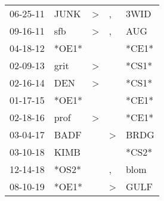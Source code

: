 \begin{supertabular}{p{0.07\textwidth}p{0.06\textwidth}p{0.02\textwidth}p{0.02\textwidth}p{0.06\textwidth}}
 06-25-11\textsuperscript{} &  JUNK\textsuperscript{} &  \textgreater &             , &  3WID\textsuperscript{} \\
 09-16-11\textsuperscript{} &   sfb\textsuperscript{} &  \textgreater &             , &   AUG\textsuperscript{} \\
 04-18-12\textsuperscript{} &                   *OE1* &               &               &                   *CE1* \\
 02-09-13\textsuperscript{} &  grit\textsuperscript{} &  \textgreater &               &                   *CS1* \\
 02-16-14\textsuperscript{} &   DEN\textsuperscript{} &  \textgreater &               &                   *CS1* \\
 01-17-15\textsuperscript{} &                   *OE1* &               &               &                   *CE1* \\
 02-18-16\textsuperscript{} &  prof\textsuperscript{} &  \textgreater &               &                   *CE1* \\
 03-04-17\textsuperscript{} &  BADF\textsuperscript{} &               &  \textgreater &  BRDG\textsuperscript{} \\
 03-10-18\textsuperscript{} &  KIMB\textsuperscript{} &               &               &                   *CS2* \\
 12-14-18\textsuperscript{} &                   *OS2* &               &             , &  blom\textsuperscript{} \\
 08-10-19\textsuperscript{} &                   *OE1* &               &  \textgreater &  GULF\textsuperscript{} \\
\end{supertabular}
